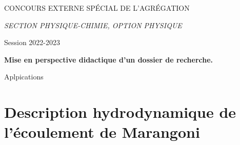 \documentclass[french, 10pt]{article}
\begin{document}


\begin{center}
\LARGE{CONCOURS EXTERNE SPÉCIAL DE L'AGRÉGATION}\medskip

 \LARGE{\textit{SECTION PHYSIQUE-CHIMIE, OPTION PHYSIQUE}}\medskip

\large{Session 2022-2023}\bigskip

\textbf{\LARGE{\textcolor{cobalt}{Mise en perspective didactique d'un dossier de recherche.}}}\bigskip

\Large{Aplpications}
\end{center}



\section{Description hydrodynamique de l'écoulement de Marangoni}
\end{document}
